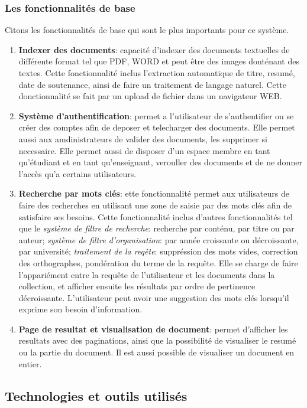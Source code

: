\subsubsection{Les fonctionnalités de base}
Citons les fonctionnalités de base qui sont le plus importants pour ce système.
\begin{enumerate}
    \item \textbf{Indexer des documents}: capacité d'indexer des documents textuelles de différente format tel que PDF, WORD et peut être des images donténant des textes. Cette fonctionnalité inclus l'extraction automatique de titre, resumé, date de soutenance, ainsi de faire un traitement de langage naturel. Cette donctionnalité se fait par un upload de fichier dans un navigateur WEB\@.
    \item \textbf{Système d'authentification}: permet a l'utilisateur de s'authentifier ou se créer des comptes afin de deposer et telecharger des documents. Elle permet aussi aux amdinistrateurs de valider des documents, les supprimer si necessaire. Elle permet aussi de disposer d'un espace membre en tant qu'étudiant et en tant qu'enseignant, verouller des documents et de ne donner l'accès qu'a certains utilisateurs.
    \item \textbf{Recherche par mots clés}: ette fonctionnalité permet aux utilisateurs de faire des recherches en utilisant une zone de saisie par des mots clés afin de satisfaire ses besoins. Cette fonctionnalité inclus d'autres fonctionnalités tel que le \emph{système de filtre de recherche}: recherche par conténu, par titre ou par auteur; \emph{système de filtre d'organisation}: par année croissante ou décroissante, par université; \emph{traitement de la reqête}: suppréssion des mots vides, correction des orthographes, pondération du terme de la requête. Elle se charge de faire l'appariément entre la requête de l'utilisateur et les documents dans la collection, et afficher ensuite les résultats par ordre de pertinence décroissante. L'utilisateur peut avoir une suggestion des mots clés lorsqu'il exprime son besoin d'information.
    \item \textbf{Page de resultat et visualisation de document}: permet d'afficher les resultats avec des paginations, ainsi que la possibilité de visualiser le resumé ou la partie du document. Il est aussi possible de visualiser un document en entier.
\end{enumerate}

\subsection{Technologies et outils utilisés}
